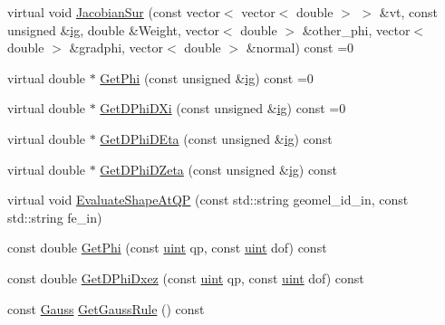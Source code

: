 \begin{DoxyCompactItemize}
\item 
virtual void \mbox{\hyperlink{classfemus_1_1elem__type_aee56bc66a4d90ae7f7669bf7fa9ed8d7}{Jacobian\+Sur}} (const vector$<$ vector$<$ double $>$ $>$ \&vt, const unsigned \&\mbox{\hyperlink{namespacefemus_a6df31099f676311de214a312d7043941}{ig}}, double \&Weight, vector$<$ double $>$ \&other\+\_\+phi, vector$<$ double $>$ \&gradphi, vector$<$ double $>$ \&normal) const =0
\item 
virtual double $\ast$ \mbox{\hyperlink{classfemus_1_1elem__type_a2aa2a37b15debbee27918f5e3f2df6b3}{Get\+Phi}} (const unsigned \&\mbox{\hyperlink{namespacefemus_a6df31099f676311de214a312d7043941}{ig}}) const =0
\item 
virtual double $\ast$ \mbox{\hyperlink{classfemus_1_1elem__type_a6efb6026b9fe89912ec367b235bfccc7}{Get\+D\+Phi\+D\+Xi}} (const unsigned \&\mbox{\hyperlink{namespacefemus_a6df31099f676311de214a312d7043941}{ig}}) const =0
\item 
virtual double $\ast$ \mbox{\hyperlink{classfemus_1_1elem__type_a510e44439de5cdd6ab5d04e3f8a5bdfe}{Get\+D\+Phi\+D\+Eta}} (const unsigned \&\mbox{\hyperlink{namespacefemus_a6df31099f676311de214a312d7043941}{ig}}) const
\item 
virtual double $\ast$ \mbox{\hyperlink{classfemus_1_1elem__type_aa507628a4383a9687c8fdefe30d0214a}{Get\+D\+Phi\+D\+Zeta}} (const unsigned \&\mbox{\hyperlink{namespacefemus_a6df31099f676311de214a312d7043941}{ig}}) const
\item 
virtual void \mbox{\hyperlink{classfemus_1_1elem__type_ab5244df8f1bc5c57a81158787bb1a588}{Evaluate\+Shape\+At\+QP}} (const std\+::string geomel\+\_\+id\+\_\+in, const std\+::string fe\+\_\+in)
\item 
const double \mbox{\hyperlink{classfemus_1_1elem__type_a0112208bbdff765b47effbe352734fbe}{Get\+Phi}} (const \mbox{\hyperlink{_typedefs_8hpp_a91ad9478d81a7aaf2593e8d9c3d06a14}{uint}} qp, const \mbox{\hyperlink{_typedefs_8hpp_a91ad9478d81a7aaf2593e8d9c3d06a14}{uint}} dof) const
\item 
const double \mbox{\hyperlink{classfemus_1_1elem__type_a8de9e4d4d56ef38431a5050269390e1a}{Get\+D\+Phi\+Dxez}} (const \mbox{\hyperlink{_typedefs_8hpp_a91ad9478d81a7aaf2593e8d9c3d06a14}{uint}} qp, const \mbox{\hyperlink{_typedefs_8hpp_a91ad9478d81a7aaf2593e8d9c3d06a14}{uint}} dof) const
\item 
const \mbox{\hyperlink{classfemus_1_1_gauss}{Gauss}} \mbox{\hyperlink{classfemus_1_1elem__type_a830387ca17a267d99a8ec97fa0548fc3}{Get\+Gauss\+Rule}} () const
\item 

\end{DoxyCompactItemize}

